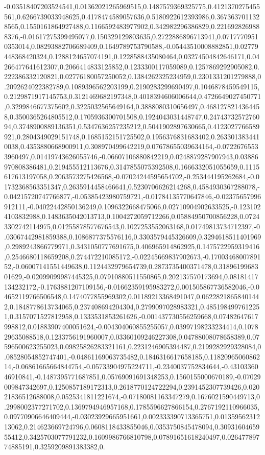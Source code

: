 -0.03518407203524541,0.01362021265969515,0.1487579369325775,0.4121370275455561,0.6266739033948625,0.4178474589057636,0.5180922612393986,0.3673637011328565,0.1550161864927488,0.1166592483977902,0.342982296386829,0.2216928269888376,-0.01617275399495077,0.150329129803635,0.2722886896713941,0.07177709510353014,0.08293882706689409,0.1649789753790588,-0.05443510008882851,0.02779448368420324,0.1288124657074191,0.1228588435080464,0.03274504842646171,0.04266477641612307,0.2066414833125852,0.1233300117059089,0.1257869292905082,0.222386332120821,0.02776180057250052,0.1384262325234959,0.2301331201279888,0.2092624022382789,0.1089396562203199,0.2190283299690497,0.1046878459549115,0.2129871917145753,0.3121469682197348,0.4018394606006644,0.4726649027450771,0.3299846677375602,0.3225032565649164,0.3888080310656497,0.4681278214364458,0.3500365264805512,0.1705936300701508,0.1924043031448747,0.2474373257276094,0.3748900889136351,0.5347636257235212,0.5041902897630665,0.4123027766589921,0.2804349029151748,0.1685152151725502,0.1956376831683402,0.2633013834410038,0.4353880668900911,0.308970499642219,0.07678655039634164,-0.07226765533960497,0.01419743626055746,-0.06607106880842219,0.0248879287907943,0.03886970808386481,0.219455512113676,0.3147855075392508,0.1666332051055659,0.1115617613197058,0.2063573275426568,-0.07024244595654702,-0.253444195262684,-0.01732368563351347,0.2635914458466641,0.5230706626214268,0.4584930367288078,-0.04215720747766877,-0.05385423980759721,-0.01784135770647846,-0.02375657996912111,-0.04022442850136249,0.1096322668475066,0.02710904902633525,-0.1231024103832988,0.1483635042013713,0.1004272059712266,0.05884950700856228,0.07243302742114975,0.01255878577676543,0.1027253552063168,0.01749813734712397,-0.03067442981859388,0.1086877375576116,0.3303579445326609,0.3294618511401969,0.2989243866779971,0.3431050777691675,0.406965914862925,0.1475722959319416,0.2546680118659208,0.274472210085172,-0.02245669837902673,-0.1700346800789152,-0.06007141551449638,0.1124432979654739,0.2873735400371478,0.3189619968301629,-0.02099099987445325,0.07910880511550865,0.202137570173694,0.08181417134232172,-0.1763881207109156,-0.01662359195983272,0.001505867736582046,-0.04652119766506548,0.1474077855969302,0.01189213368491047,0.06228218658401442,0.1848778613734065,0.237408694204304,0.2799097028983321,0.4851984997612251,0.3157071527812958,0.1333531853261626,-0.001437730556259668,0.07482647617998812,0.01883907400051624,-0.004304060855255057,0.03997198233234414,0.107829635088518,0.1233756191960007,0.03360109246227308,0.04788008078658389,0.07596500623255023,0.09825826283321161,0.2231246905394487,0.2199282929328084,0.08528054852747401,-0.04861169063735482,0.1846316617658185,0.1182096506086214,-0.06861665664844754,-0.05733904975224711,-0.2340037752834644,-0.4310336046910841,-0.1487395771687851,0.05769091691348253,0.1560155000670189,-0.07029009847342697,0.1250857189172313,0.2618770124722294,0.2391452307739426,0.02021836512688008,0.0525341811221674,-0.07180081163347279,0.1676021590449713,0.2998002377271702,0.1369794946957168,0.1785596627866154,0.2767192110966035,0.09770906646409444,-0.03023929665951661,0.002333390713365751,0.0135956231213062,0.214623669724796,0.0608118433855046,0.0353750845478094,0.3093160465955412,0.3425703077791232,0.1609986766810798,0.07891651618240497,0.02647789774885191,0.3259209891383382,0.